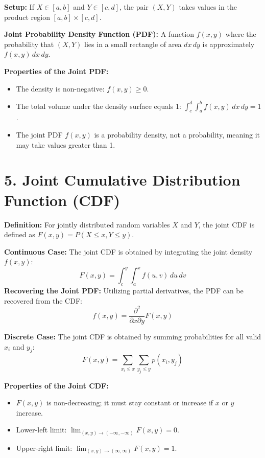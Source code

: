\documentclass[12pt]{article}
\begin{document}
\noindent
\textbf{Setup:} If $X \in [a, b]$ and $Y \in [c, d]$, the pair $(X, Y)$ takes values in the product region $[a, b] \times [c, d]$.

\noindent
\textbf{Joint Probability Density Function (PDF):} A function $f(x, y)$ where the probability that $(X, Y)$ lies in a small rectangle of area $dx \, dy$ is approximately $f(x, y) \, dx \, dy$.

\noindent
\textbf{Properties of the Joint PDF:}
\begin{itemize}
    \item The density is non-negative: $f(x, y) \ge 0$.
    \item The total volume under the density surface equals 1: $\int_{c}^{d} \int_{a}^{b} f(x, y) \, dx \, dy = 1$.
    \item The joint PDF $f(x, y)$ is a probability density, not a probability, meaning it may take values greater than 1.
\end{itemize}

\newpage

\section{5. Joint Cumulative Distribution Function (CDF)}
\textbf{Definition:} For jointly distributed random variables $X$ and $Y$, the joint CDF is defined as $F(x, y) = P(X \le x, Y \le y)$.

\noindent
\textbf{Continuous Case:} The joint CDF is obtained by integrating the joint density $f(x, y)$:
\[ F(x, y) = \int_{c}^{y} \int_{a}^{x} f(u, v) \, du \, dv \]
\textbf{Recovering the Joint PDF:} Utilizing partial derivatives, the PDF can be recovered from the CDF:
\[ f(x, y) = \frac{\partial^2}{\partial x \partial y} F(x, y) \]

\noindent
\textbf{Discrete Case:} The joint CDF is obtained by summing probabilities for all valid $x_i$ and $y_j$:
\[ F(x, y) = \sum_{x_i \le x} \sum_{y_j \le y} p(x_i, y_j) \]

\noindent
\textbf{Properties of the Joint CDF:}
\begin{itemize}
    \item $F(x, y)$ is non-decreasing; it must stay constant or increase if $x$ or $y$ increase.
    \item Lower-left limit: $\lim_{(x,y) \to (-\infty, -\infty)} F(x, y) = 0$.
    \item Upper-right limit: $\lim_{(x,y) \to (\infty, \infty)} F(x, y) = 1$.
\end{itemize}
\end{document}
